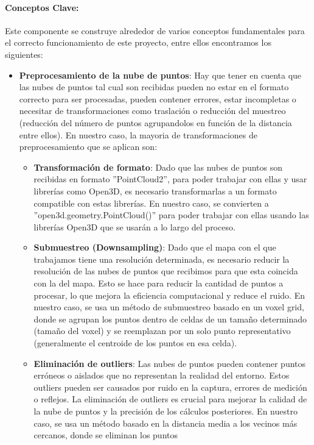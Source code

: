 \documentclass[12pt, a4paper, twoside]{article}
\begin{document}
\paragraph{Conceptos Clave:}
Este componente se construye alrededor de varios conceptos fundamentales para el correcto funcionamiento de este proyecto, entre ellos encontramos los 
siguientes:
\begin{itemize}
  \item \textbf{Preprocesamiento de la nube de puntos}: Hay que tener en cuenta que las nubes de puntos tal cual son recibidas pueden no estar en el formato 
  correcto para ser procesadas, pueden contener errores, estar incompletas o necesitar de transformaciones como traslación o reducción del muestreo (reducción 
  del número de puntos agrupandolos en función de la distancia entre ellos). En nuestro caso, la mayoria de transformaciones de preprocesamiento que se aplican 
  son:
  \begin{itemize}
    \item \textbf{Transformación de formato}: Dado que las nubes de puntos son recibidas en formato ''PointCloud2'', para poder trabajar con ellas y usar librerías como
    Open3D\cite{Zhou2018}, es necesario transformarlas a un formato compatible con estas librerías. En nuestro caso, se convierten a
    ''open3d.geometry.PointCloud()'' para poder trabajar con ellas usando las librerías Open3D que se usarán a lo largo del proceso. 
    \item \textbf{Submuestreo (Downsampling)}: Dado que el mapa con el que trabajamos tiene una resolución determinada, es necesario reducir la resolución de
    las nubes de puntos que recibimos para que esta coincida con la del mapa. Esto se hace para reducir la cantidad de puntos a procesar, lo que mejora la 
    eficiencia computacional y reduce el ruido. En nuestro caso, se usa un método de submuestreo basado en un voxel grid, donde se agrupan los puntos dentro 
    de celdas de un tamaño determinado (tamaño del voxel) y se reemplazan por un solo punto representativo (generalmente el centroide de los puntos en esa celda).
    \item \textbf{Eliminación de outliers}: Las nubes de puntos pueden contener puntos erróneos o aislados que no representan la realidad del entorno. Estos outliers 
    pueden ser causados por ruido en la captura, errores de medición o reflejos. La eliminación de outliers es crucial para mejorar la calidad de la nube de puntos y 
    la precisión de los cálculos posteriores. En nuestro caso, se usa un método basado en la distancia media a los vecinos más cercanos, donde se eliminan los puntos 

\end{itemize}
\end{itemize}
\end{document}
